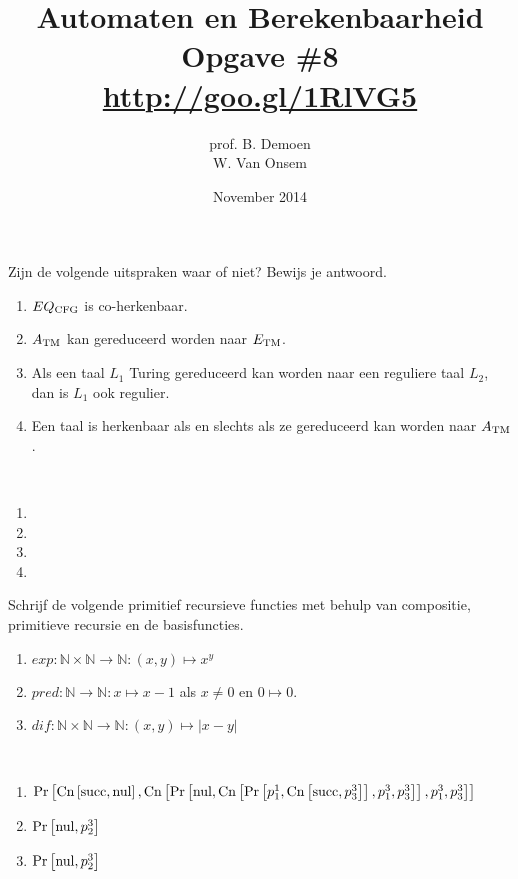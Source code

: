 \documentclass[a4paper]{article}
\title{Automaten en Berekenbaarheid\\Opgave \#8\\\url{http://goo.gl/1RlVG5}}
\author{prof. B. Demoen\\W. Van Onsem}
\date{November 2014}
\newcommand{\prnul}[0]{\ensuremath{\mbox{nul}}}
\newcommand{\prsucc}[0]{\ensuremath{\mbox{succ}}}
\newcommand{\prp}[2]{\ensuremath{p_{#2}^{#1}}}
\newcommand{\prcn}[2]{\funmf{Cn}{#1,#2}}
\newcommand{\prpr}[2]{\funmf{Pr}{#1,#2}}
\newcommand{\N}{\mathbb{N}}
\begin{document}
\maketitle

\begin{question}
Zijn de volgende uitspraken waar of niet? Bewijs je antwoord.
\begin{enumerate}
  \item $EQ_{\rm CFG}$ is co-herkenbaar.
  \item $A_{\rm TM}$ kan gereduceerd worden naar $E_{\rm TM}$.
  \item Als een taal $L_1$ Turing gereduceerd kan worden naar een reguliere taal $L_2$, dan is $L_1$ ook regulier.
  \item Een taal is herkenbaar als en slechts als ze gereduceerd kan worden naar $A_{\rm TM}$.
\end{enumerate}
\begin{answer}~~
\begin{enumerate}
 \item 
 \item 
 \item 
 \item 
\end{enumerate}
\end{answer}
\end{question}

\begin{question}
Schrijf de volgende primitief recursieve functies met behulp van compositie, primitieve recursie en de basisfuncties.
\begin{enumerate}
  \item $exp : \N \times \N \to \N : (x,y) \mapsto x^y$
  \item $pred : \N \to \N : x \mapsto x - 1$ als $x \neq 0$ en $0 \mapsto 0$.
  \item $dif : \N \times \N \to \N : (x,y) \mapsto | x - y |$
\end{enumerate}
\begin{answer}~~
\begin{enumerate}
 \item $\prpr{\prcn{\prsucc}{\prnul}}{\prcn{\prpr{\prnul}{\prcn{\prpr{\prp{1}{1}}{\prcn{\prsucc}{\prp{3}{3}}}}{\prp{3}{1},\prp{3}{3}}}}{\prp{3}{1},\prp{3}{3}}}$
 \item $\prpr{\prnul}{\prp{3}{2}}$
 \item $\prpr{\prnul}{\prp{3}{2}}$
\end{enumerate}
\end{answer}
\end{question}
\end{document}
